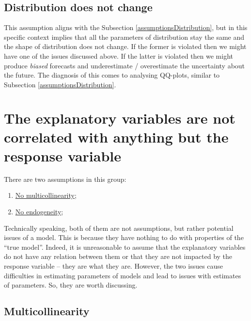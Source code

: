 \documentclass[
]{book}
\providecommand{\tightlist}{%
  \setlength{\itemsep}{0pt}\setlength{\parskip}{0pt}}
\theoremstyle{definition}
\theoremstyle{definition}
\theoremstyle{definition}
\theoremstyle{definition}
\theoremstyle{remark}
\begin{document}
\subsection{Distribution does not change}\label{assumptionsDistributionFixed}

This assumption aligns with the Subsection \ref{assumptionsDistribution}, but in this specific context implies that all the parameters of distribution stay the same and the shape of distribution does not change. If the former is violated then we might have one of the issues discussed above. If the latter is violated then we might produce \emph{biased} forecasts and underestimate / overestimate the uncertainty about the future. The diagnosis of this comes to analysing QQ-plots, similar to Subsection \ref{assumptionsDistribution}.

\section{The explanatory variables are not correlated with anything but the response variable}\label{assumptionsXreg}

There are two assumptions in this group:

\begin{enumerate}
\def\labelenumi{\arabic{enumi}.}
\tightlist
\item
  \hyperref[assumptionsXregMulti]{No multicollinearity};
\item
  \hyperref[assumptionsXregEndogeneity]{No endogeneity};
\end{enumerate}

Technically speaking, both of them are not assumptions, but rather potential issues of a model. This is because they have nothing to do with properties of the ``true model''. Indeed, it is unreasonable to assume that the explanatory variables do not have any relation between them or that they are not impacted by the response variable -- they are what they are. However, the two issues cause difficulties in estimating parameters of models and lead to issues with estimates of parameters. So, they are worth discussing.

\subsection{Multicollinearity}\label{assumptionsXregMulti}
\end{document}
